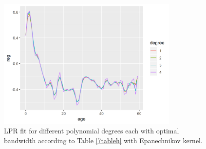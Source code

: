 \begin{figure}[!t]
\centering
\includegraphics[width=0.8\textwidth, keepaspectratio]{ex9/fitsh.png}
\caption{LPR fit for different polynomial degrees each with optimal bandwidth according to Table \ref{7tableh} with Epanechnikov kernel.}
\label{7fitsh}
\end{figure}

